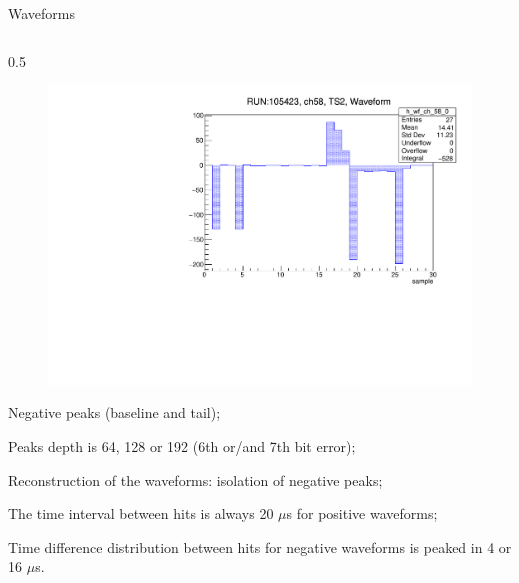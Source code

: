 \documentclass{beamer}[10pt]
\begin{document}
\begin{frame}{Waveforms}
\begin{columns}
\begin{column}{0.5\framewidth}
\vspace{-7mm}
\begin{figure}[H]
   \centering
   \includegraphics[width= 1.0\columnwidth]{figures/pdf/waveform_biterror.pdf}
   \label{fig:wffytl}
 \end{figure}
\begin{itemize}
{\tiny
\item Negative peaks (baseline and tail);
\item Peaks depth is 64, 128 or 192 (6th or/and 7th bit error);
\item Reconstruction of the waveforms: isolation of negative peaks;
\item The time interval between hits is always 20 $\mu$s for positive waveforms; 
\item Time difference distribution between hits for negative waveforms is peaked in 4 or 16 $\mu$s.}
\end{itemize}
\end{column}
\end{columns}
\end{frame}
\end{document}

